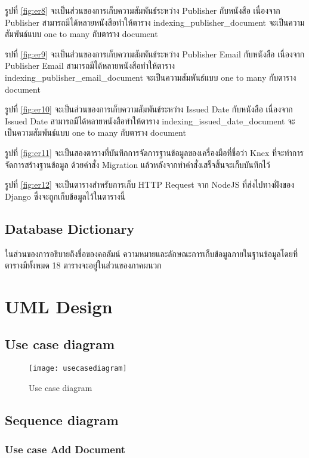 รูปที่ \ref{fig:er8} จะเป็นส่วนของการเก็บความสัมพันธ์ระหว่าง Publisher กับหนังสือ เนื่องจาก Publisher สามารถมีได้หลายหนังสือทำให้ตาราง indexing\_publisher\_document จะเป็นความสัมพันธ์แบบ one to many กับตาราง document 

รปที่ \ref{fig:er9} จะเป็นส่วนของการเก็บความสัมพันธ์ระหว่าง Publisher Email กับหนังสือ เนื่องจาก Publisher Email สามารถมีได้หลายหนังสือทำให้ตาราง indexing\_publisher\_email\_document จะเป็นความสัมพันธ์แบบ one to many กับตาราง document

รูปที่ \ref{fig:er10} จะเป็นส่วนของการเก็บความสัมพันธ์ระหว่าง Issued Date กับหนังสือ เนื่องจาก Issued Date สามารถมีได้หลายหนังสือทำให้ตาราง indexing\_issued\_date\_document จะเป็นความสัมพันธ์แบบ one to many กับตาราง document 

รูปที่ \ref{fig:er11} จะเป็นสองตารางที่บันทึกการจัดการฐานข้อมูลของเครื่องมือที่ชื่อว่า Knex ที่จะทำการจัดการสร้างฐานข้อมูล ด้วยคำสั่ง Migration แล้วหลังจากทำคำสั่งเสร็จสิ้นจะเก็บบันทึกไว้

รูปที่ \ref{fig:er12} จะเป็นตารางสำหรับการเก็บ HTTP Request จาก NodeJS ที่ส่งไปทางฝั่งของ Django ซึ่งจะถูกเก็บข้อมูลไว้ในตารางนี้

\subsection{Database Dictionary}

ในส่วนของการอธิบายถึงชื่อของคอลัมน์ ความหมายและลักษณะการเก็บข้อมูลภายในฐานข้อมูลโดยที่ตารางมีทั้งหมด 18 ตารางจะอยู่ในส่วนของภาคผนวก

\section{UML Design}
\subsection{Use case diagram}

\begin{figure}[H]
    \centering
    \texttt{[image: usecasediagram]}
    \caption{Use case diagram}\label{fig:usecasediagram}
\end{figure}

\subsection{Sequence diagram}

\subsubsection{Use case Add Document}

